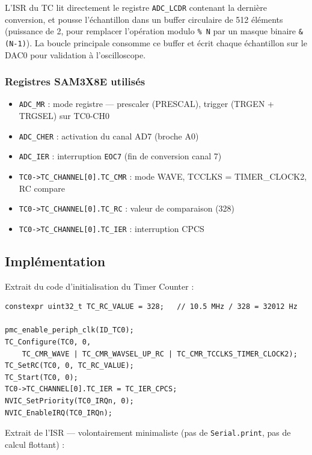 L'ISR du TC lit directement le registre \texttt{ADC\_LCDR} contenant la dernière conversion, et pousse l'échantillon dans un buffer circulaire de 512 éléments (puissance de 2, pour remplacer l'opération modulo \texttt{\% N} par un masque binaire \texttt{\& (N-1)}). La boucle principale consomme ce buffer et écrit chaque échantillon sur le DAC0 pour validation à l'oscilloscope.

\subsubsection{Registres SAM3X8E utilisés}

\begin{itemize}
    \item \texttt{ADC\_MR} : mode registre --- prescaler (PRESCAL), trigger (TRGEN + TRGSEL) sur TC0-CH0
    \item \texttt{ADC\_CHER} : activation du canal AD7 (broche A0)
    \item \texttt{ADC\_IER} : interruption \texttt{EOC7} (fin de conversion canal 7)
    \item \texttt{TC0->TC\_CHANNEL[0].TC\_CMR} : mode WAVE, TCCLKS = TIMER\_CLOCK2, RC compare
    \item \texttt{TC0->TC\_CHANNEL[0].TC\_RC} : valeur de comparaison (328)
    \item \texttt{TC0->TC\_CHANNEL[0].TC\_IER} : interruption CPCS
\end{itemize}

\subsection{Implémentation}

Extrait du code d'initialisation du Timer Counter :

\begin{lstlisting}[style=cpp, caption={Configuration du Timer Counter TC0-CH0 pour déclencher l'ADC à \SI{32}{\kilo\hertz}.}]
constexpr uint32_t TC_RC_VALUE = 328;   // 10.5 MHz / 328 = 32012 Hz

pmc_enable_periph_clk(ID_TC0);
TC_Configure(TC0, 0,
    TC_CMR_WAVE | TC_CMR_WAVSEL_UP_RC | TC_CMR_TCCLKS_TIMER_CLOCK2);
TC_SetRC(TC0, 0, TC_RC_VALUE);
TC_Start(TC0, 0);
TC0->TC_CHANNEL[0].TC_IER = TC_IER_CPCS;
NVIC_SetPriority(TC0_IRQn, 0);
NVIC_EnableIRQ(TC0_IRQn);
\end{lstlisting}

Extrait de l'ISR --- volontairement minimaliste (pas de \texttt{Serial.print}, pas de calcul flottant) :

